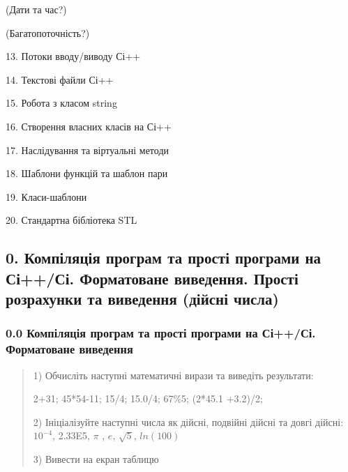 \documentclass[]{article}
\begin{document}
(Дати та час?)

(Багатопоточність?)

13. Потоки вводу/виводу Сі++

14. Текстові файли Сі++

15. Робота з класом string

16. Створення власних класів на Сі++

17. Наслідування та віртуальні методи

18. Шаблони функцій та шаблон пари

19. Класи-шаблони

20. Стандартна бібліотека STL

\subsection{}\label{section}

\subsection{0. Компіляція програм та прості програми на Сі++/Сі.
Форматоване виведення. Прості розрахунки та виведення (дійсні
числа)}\label{ux43aux43eux43cux43fux456ux43bux44fux446ux456ux44f-ux43fux440ux43eux433ux440ux430ux43c-ux442ux430-ux43fux440ux43eux441ux442ux456-ux43fux440ux43eux433ux440ux430ux43cux438-ux43dux430-ux441ux456ux441ux456.-ux444ux43eux440ux43cux430ux442ux43eux432ux430ux43dux435-ux432ux438ux432ux435ux434ux435ux43dux43dux44f.-ux43fux440ux43eux441ux442ux456-ux440ux43eux437ux440ux430ux445ux443ux43dux43aux438-ux442ux430-ux432ux438ux432ux435ux434ux435ux43dux43dux44f-ux434ux456ux439ux441ux43dux456-ux447ux438ux441ux43bux430}

\subsubsection{0.0 Компіляція програм та прості програми на Сі++/Сі.
Форматоване
виведення}\label{ux43aux43eux43cux43fux456ux43bux44fux446ux456ux44f-ux43fux440ux43eux433ux440ux430ux43c-ux442ux430-ux43fux440ux43eux441ux442ux456-ux43fux440ux43eux433ux440ux430ux43cux438-ux43dux430-ux441ux456ux441ux456.-ux444ux43eux440ux43cux430ux442ux43eux432ux430ux43dux435-ux432ux438ux432ux435ux434ux435ux43dux43dux44f}

\begin{quote}
1) Обчисліть наступні математичні вирази та виведіть результати:

2+31; 45*54-11; 15/4; 15.0/4; 67\%5; (2*45.1 +3.2)/2;

2) Ініціалізуйте наступні числа як дійсні, подвійні дійсні та довгі
дійсні:\(10^{- 4}\), 2.33E5, \(\pi\) , \(e\), \(\sqrt{5}\), \(ln(100)\)

3) Вивести на екран таблицю
\end{quote}
\end{document}
